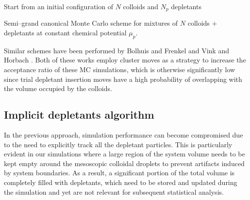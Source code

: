 \begin{algorithm}[h]
    \SetAlgoLined

    Start from an initial configuration of $N$ colloids and $N_p$ depletants\;
    \caption{Semi--grand canonical Monte Carlo scheme for mixtures of $N$ colloids $+$ depletants at constant chemical potential $\mu_p$. }
    \label{algo:semiHPMC}
\end{algorithm}

Similar schemes have been performed by Bolhuis and Frenkel \cite{Bolhuis1994} and Vink and Horbach \cite{Vink2004}. Both of these works employ cluster moves as a strategy to increase the acceptance ratio of these MC simulations, which is otherwise significantly low since trial depletant insertion moves have a high probability of overlapping with the volume occupied by the colloids.

\subsection{Implicit depletants algorithm}

In the previous approach, simulation performance can become compromised due to the need to explicitly track all the depletant particles. This is particularly evident in our simulations where a large region of the system volume needs to be kept empty around the mesoscopic colloidal droplets to prevent artifacts induced by system boundaries. As a result, a significant portion of the total volume is completely filled with depletants, which need to be stored and updated during the simulation and yet are not relevant for subsequent statistical analysis.

